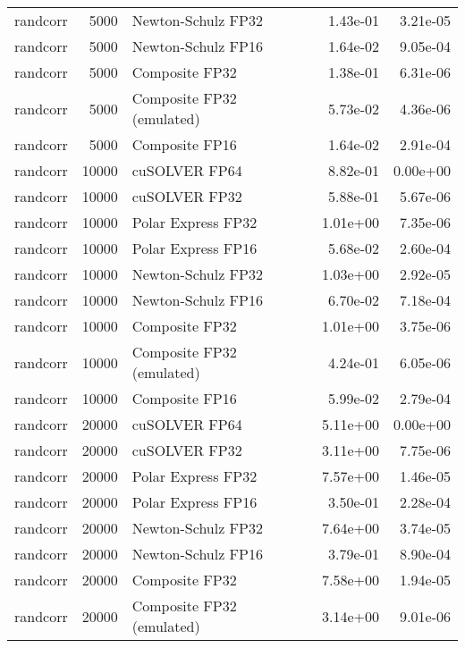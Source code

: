 \begin{table}
\begin{tabular}{lrlrr}
 randcorr &  5000 &        Newton-Schulz FP32 &  1.43e-01 &        3.21e-05 \\
 randcorr &  5000 &        Newton-Schulz FP16 &  1.64e-02 &        9.05e-04 \\
 randcorr &  5000 &            Composite FP32 &  1.38e-01 &        6.31e-06 \\
 randcorr &  5000 & Composite FP32 (emulated) &  5.73e-02 &        4.36e-06 \\
 randcorr &  5000 &            Composite FP16 &  1.64e-02 &        2.91e-04 \\
 randcorr & 10000 &             cuSOLVER FP64 &  8.82e-01 &        0.00e+00 \\
 randcorr & 10000 &             cuSOLVER FP32 &  5.88e-01 &        5.67e-06 \\
 randcorr & 10000 &        Polar Express FP32 &  1.01e+00 &        7.35e-06 \\
 randcorr & 10000 &        Polar Express FP16 &  5.68e-02 &        2.60e-04 \\
 randcorr & 10000 &        Newton-Schulz FP32 &  1.03e+00 &        2.92e-05 \\
 randcorr & 10000 &        Newton-Schulz FP16 &  6.70e-02 &        7.18e-04 \\
 randcorr & 10000 &            Composite FP32 &  1.01e+00 &        3.75e-06 \\
 randcorr & 10000 & Composite FP32 (emulated) &  4.24e-01 &        6.05e-06 \\
 randcorr & 10000 &            Composite FP16 &  5.99e-02 &        2.79e-04 \\
 randcorr & 20000 &             cuSOLVER FP64 &  5.11e+00 &        0.00e+00 \\
 randcorr & 20000 &             cuSOLVER FP32 &  3.11e+00 &        7.75e-06 \\
 randcorr & 20000 &        Polar Express FP32 &  7.57e+00 &        1.46e-05 \\
 randcorr & 20000 &        Polar Express FP16 &  3.50e-01 &        2.28e-04 \\
 randcorr & 20000 &        Newton-Schulz FP32 &  7.64e+00 &        3.74e-05 \\
 randcorr & 20000 &        Newton-Schulz FP16 &  3.79e-01 &        8.90e-04 \\
 randcorr & 20000 &            Composite FP32 &  7.58e+00 &        1.94e-05 \\
 randcorr & 20000 & Composite FP32 (emulated) &  3.14e+00 &        9.01e-06 \\

\end{tabular}
\end{table}
